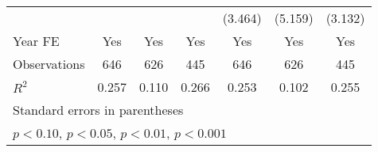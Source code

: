\begin{table}[htbp]
\begin{tabular}{l*{6}{c}}
                &                  &                  &                  &  (3.464)         &  (5.159)         &  (3.132)         \\
\addlinespace
Year FE         &      Yes         &      Yes         &      Yes         &      Yes         &      Yes         &      Yes         \\
\midrule
Observations    &      646         &      626         &      445         &      646         &      626         &      445         \\
\(R^{2}\)       &    0.257         &    0.110         &    0.266         &    0.253         &    0.102         &    0.255         \\
\bottomrule
\multicolumn{7}{l}{\footnotesize Standard errors in parentheses}\\
\multicolumn{7}{l}{\footnotesize \sym{+} \(p<0.10\), \sym{*} \(p<0.05\), \sym{**} \(p<0.01\), \sym{***} \(p<0.001\)}\\
\end{tabular}
\end{table}
